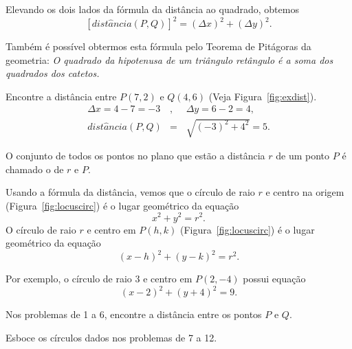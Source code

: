 \documentclass{svmono}
\begin{document}
Elevando os dois lados da fórmula da distância ao quadrado, obtemos
\[
  [dist\hat{a}ncia(P,Q)]^2 = (\Delta x)^2 + (\Delta y)^2.
\]

Também é possível obtermos esta fórmula pelo Teorema de Pitágoras
da geometria: \emph{O quadrado da hipotenusa de um triângulo
retângulo é a soma dos quadrados dos catetos.}

\begin{example}
\label{ex:distance}
Encontre a distância entre $P(7,2)$ e $Q(4,6)$
(Veja Figura~\ref{fig:exdist}).
\begin{eqnarray*}
\Delta x = 4 - 7 = -3 &,\phantom{,} & \Delta y = 6 - 2 = 4, \\
 dist\hat{a}ncia(P,Q) & =           & \sqrt{(-3)^2 + 4^2} = 5.
\end{eqnarray*}
\end{example}


\begin{defin}[círculo]
O conjunto de todos os pontos no plano que estão a distância $r$ de um ponto
$P$ é chamado o  de  $r$ e  $P$.
\end{defin}

Usando a fórmula da distância, vemos que o círculo de raio $r$ e centro na
origem (Figura~\ref{fig:locuscirc}) é o lugar geométrico da equação
\[
	x^2 + y^2 = r^2.
\]
O círculo de raio $r$ e centro em $P(h,k)$ (Figura~\ref{fig:locuscirc}) é
o lugar geométrico da equação
\[
	(x-h)^2 + (y-k)^2 = r^2.
\]


Por exemplo, o círculo de raio $3$ e centro em $P(2,-4)$ possui equação
\[
	(x-2)^2 + (y+4)^2 = 9.
\]

\sectionproblems

\noindent Nos problemas de 1 a 6, encontre a distância entre
          os pontos $P$ e $Q$.

\begin{multicols}{2}
\end{multicols}

\noindent Esboce os círculos dados nos problemas de 7 a 12.

\begin{multicols}{2}
\end{multicols}
\end{document}
